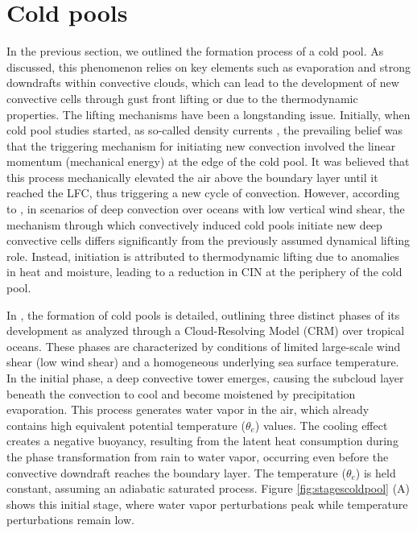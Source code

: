 \section{Cold pools}
\label{section22}

In the previous section, we outlined the formation process of a cold pool. As discussed, this phenomenon relies on key elements such as evaporation and strong downdrafts within convective clouds, which can lead to the development of new convective cells through gust front lifting or due to the thermodynamic properties. The lifting mechanisms have been a longstanding issue. Initially, when cold pool studies started, as so-called density currents  \cite{emanuel1994atmospheric, weisman2004theory}, the prevailing belief was that the triggering mechanism for initiating new convection involved the linear momentum (mechanical energy) at the edge of the cold pool. It was believed that this process mechanically elevated the air above the boundary layer until it reached the LFC, thus triggering a new cycle of convection. However, according to , in scenarios of deep convection over oceans with low vertical wind shear, the mechanism through which convectively induced cold pools initiate new deep convective cells differs significantly from the previously assumed dynamical lifting role. Instead, initiation is attributed to thermodynamic lifting due to anomalies in heat and moisture, leading to a reduction in CIN at the periphery of the cold pool.

In , the formation of cold pools is detailed, outlining three distinct phases of its development as analyzed through a Cloud-Resolving Model (CRM) over tropical oceans. These phases are characterized by conditions of limited large-scale wind shear (low wind shear) and a homogeneous underlying sea surface temperature. In the initial phase, a deep convective tower emerges, causing the subcloud layer beneath the convection to cool and become moistened by precipitation evaporation. This process generates water vapor in the air, which already contains high equivalent potential temperature ($\theta _e$) values. The cooling effect creates a negative buoyancy, resulting from the latent heat consumption during the phase transformation from rain to water vapor, occurring even before the convective downdraft reaches the boundary layer. The temperature ($\theta _e$) is held constant, assuming an adiabatic saturated process. Figure \ref{fig:stagescoldpool} (A) shows this initial stage, where water vapor perturbations peak while temperature perturbations remain low.

